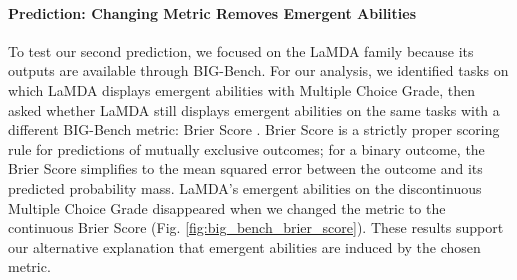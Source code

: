 \paragraph{Prediction: Changing Metric Removes Emergent Abilities}

To test our second prediction, 
we focused on the LaMDA family \cite{thoppilan2022lamda} because its outputs are available through BIG-Bench.
For our analysis, we identified tasks on which LaMDA displays emergent abilities with Multiple Choice Grade, then asked whether LaMDA still displays emergent abilities on the same tasks with a different BIG-Bench metric: Brier Score \cite{brier1950verification}. 
Brier Score is a strictly proper scoring rule for predictions of mutually exclusive outcomes; for a binary outcome, the Brier Score simplifies to the mean squared error between the outcome and its predicted probability mass.
LaMDA's emergent abilities on the discontinuous Multiple Choice Grade disappeared when we changed the metric to the continuous Brier Score (Fig. \ref{fig:big_bench_brier_score}).
These results support our alternative explanation that emergent abilities are induced by the chosen metric.
